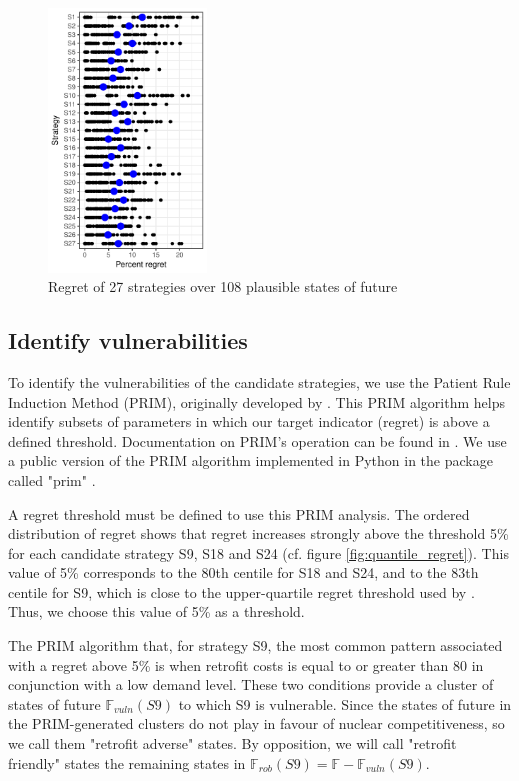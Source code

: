 \begin{figure}[!ht]
	\centering
	\includegraphics[height=7cm]{figures/regret.pdf}
	\caption{Regret of 27 strategies over 108 plausible states of future}
	\label{fig:regret}
\end{figure}

\subsection{Identify vulnerabilities}

To identify the vulnerabilities of the candidate strategies, we use the Patient Rule Induction Method (PRIM), originally developed by \citet{Friedman1999}. This PRIM algorithm helps identify subsets of parameters in which our target indicator (regret) is above a defined threshold. Documentation on PRIM's operation can be found in \citet{Bryant2010}. We use a public version of the PRIM algorithm implemented in Python in the package called "prim" \citep{Hadka}. 

A regret threshold must be defined to use this PRIM analysis. The ordered distribution of regret shows that regret increases strongly above the threshold 5\% for each candidate strategy S9, S18 and S24 (cf. figure \ref{fig:quantile_regret}). This value of 5\% corresponds to the 80th centile for S18 and S24, and to the 83th centile for S9, which is close to the upper-quartile regret threshold used by \citet{Nahmmacher2016}. Thus, we choose this value of 5\% as a threshold. 

The PRIM algorithm that, for strategy S9, the most common pattern associated with a regret above 5\% is when retrofit costs is equal to or greater than 80 \emwh in conjunction with a low demand level. These two conditions provide a cluster of states of future $\mathbb{F}_{vuln}(S9)$ to which S9 is vulnerable. Since the states of future in the PRIM-generated clusters do not play in favour of nuclear competitiveness, so we call them "retrofit adverse" states. By opposition, we will call "retrofit friendly" states the remaining states in $\mathbb{F}_{rob}(S9) = \mathbb{F} - \mathbb{F}_{vuln}(S9)$.  

